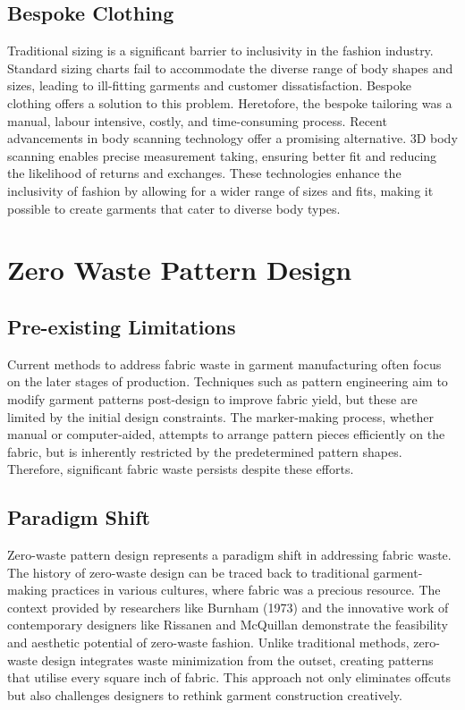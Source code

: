 \subsection{Bespoke Clothing}
Traditional sizing is a significant barrier to inclusivity in the fashion industry. Standard sizing charts fail to accommodate the diverse range of body shapes and sizes, leading to ill-fitting garments and customer dissatisfaction. Bespoke clothing offers a solution to this problem. Heretofore, the bespoke tailoring was a manual, labour intensive, costly, and time-consuming process. Recent advancements in body scanning technology offer a promising alternative. 3D body scanning enables precise measurement taking, ensuring better fit and reducing the likelihood of returns and exchanges. These technologies enhance the inclusivity of fashion by allowing for a wider range of sizes and fits, making it possible to create garments that cater to diverse body types.


\section{Zero Waste Pattern Design}

\subsection{Pre-existing Limitations}
Current methods to address fabric waste in garment manufacturing often focus on the later stages of production. Techniques such as pattern engineering aim to modify garment patterns post-design to improve fabric yield, but these are limited by the initial design constraints. The marker-making process, whether manual or computer-aided, attempts to arrange pattern pieces efficiently on the fabric, but is inherently restricted by the predetermined pattern shapes. Therefore, significant fabric waste persists despite these efforts.

\subsection{Paradigm Shift}
Zero-waste pattern design represents a paradigm shift in addressing fabric waste. The history of zero-waste design can be traced back to traditional garment-making practices in various cultures, where fabric was a precious resource. The context provided by researchers like Burnham (1973) and the innovative work of contemporary designers like Rissanen and McQuillan demonstrate the feasibility and aesthetic potential of zero-waste fashion. Unlike traditional methods, zero-waste design integrates waste minimization from the outset, creating patterns that utilise every square inch of fabric. This approach not only eliminates offcuts but also challenges designers to rethink garment construction creatively.

